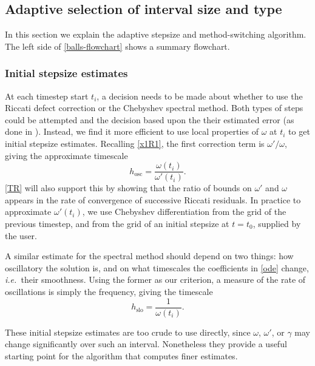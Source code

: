 \documentclass[10pt]{article}
\newcommand{\be}{\begin{equation}}
\newcommand{\ee}{\end{equation}}
\newcommand{\ie}{{\it i.e.\ }}
\newcommand{\om}{\omega}
\newcommand{\g}{\gamma}
\begin{document}
\subsection{Adaptive selection of interval size and type}
\label{adap}

In this section we explain the adaptive stepsize and method-switching
algorithm. The left side of \cref{balls-flowchart} shows
a summary flowchart.

\subsubsection{Initial stepsize estimates}
\label{hosc}

At each timestep start $t_i$, a decision needs to be made about whether to
use the Riccati defect correction or the Chebyshev spectral method.
Both types of steps could be attempted
and the decision based upon the their estimated error (as done in \cite{agocs2020efficient}).
Instead, we find it more efficient to use local properties of $\om$ at $t_i$
to get initial stepsize estimates.
Recalling \cref{x1R1}, the first correction term is $\om'/\om$, giving the
approximate timescale
\be\label{hoscini}
h_{\text{osc}} = \frac{\om(t_i)}{\om'(t_i)}.
\ee
\cref{TR} will also support this by showing that
the ratio of bounds on $\om'$ and $\om$ appears in the rate of
convergence of successive Riccati residuals.
In practice to approximate $\om'(t_i)$, we use Chebyshev differentiation
from the grid of the previous timestep, and from the grid of an initial
stepsize at $t=t_0$, supplied by the user.


A similar estimate for the spectral method should depend on two things: how
oscillatory the solution is, and on what timescales the coefficients in \cref{ode} change, \ie their smoothness. Using the former as our criterion,
a measure of the rate of
oscillations is simply the frequency, giving the timescale
\be\label{hsloini}
h_{\text{slo}} = \frac{1}{\om(t_i)}.
\ee

These initial stepsize estimates are too crude to use directly, since
$\om$, $\om'$, or $\g$ may change significantly over such an interval.
Nonetheless they provide a useful starting point for the algorithm that computes
finer estimates.
\end{document}
